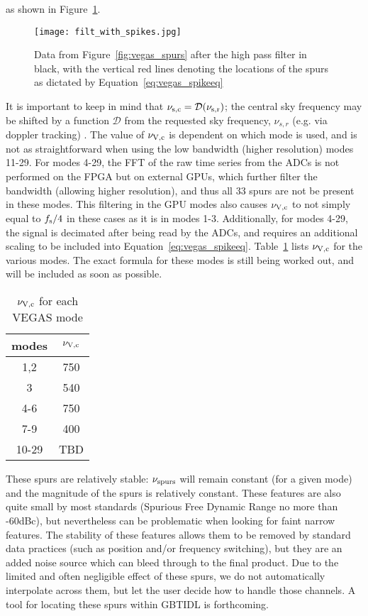 \noindent as shown in Figure~\ref{fig:vegas_spurcalc}.

\begin{figure}[h]
\texttt{[image: filt\_with\_spikes.jpg]}
\caption[Data from Figure~\ref{fig:vegas_spurs} after the high pass filter]
{Data from Figure~\ref{fig:vegas_spurs} after the high pass filter in 
black, with the vertical red lines denoting the locations of the spurs 
as dictated by Equation~\ref{eq:vegas_spikeeq}}
\label{fig:vegas_spurcalc}
\end{figure}

\noindent It is important to keep in mind that 
$\nu_{\rm s,c}=\mathcal{D}(\nu_{\rm s, r})$; the central sky frequency may be 
shifted by a function $\mathcal{D}$ from the requested sky frequency, 
$\nu_{s, r}$ (e.g. via doppler tracking) . The value of $\nu_{\rm V,c}$ is 
dependent on which mode is used, and is not as straightforward when using 
the low bandwidth (higher resolution) modes 11-29. For modes 4-29, the FFT of 
the raw time series from the ADCs is not performed on the FPGA but on 
external GPUs, which further filter the bandwidth (allowing higher resolution), 
and thus all 33 spurs are not be present in these modes. This filtering in 
the GPU modes also causes $\nu_{\rm V,c}$ to not simply equal to $f_{\rm s}/4$ in 
these cases as it is in modes 1-3. Additionally, for modes 4-29, the signal 
is decimated after being read by the ADCs, and requires an additional scaling 
to be included into Equation~\ref{eq:vegas_spikeeq}.  Table~\ref{tab:vegas_centtbl} 
lists $\nu_{\rm V,c}$ for the various modes. The exact formula for 
these modes is still being worked out, and will be included as soon as 
possible.

\begin{table}[h]
\begin{center}
\caption[$\nu_{\rm V,c}$ for each VEGAS mode]
{$\nu_{\rm V,c}$ for each VEGAS mode}
\label{tab:vegas_centtbl}
\begin{tabular}{| c | c |}
\hline
modes & $\nu_{\rm V,c}$ \\ \hline
1,2&750\\
3&540\\
4-6&750\\
7-9&400\\
10-29&TBD\\
\hline
\end{tabular}
\end{center}
\end{table}

These spurs are relatively stable: $\nu_{\rm spurs}$ will remain constant 
(for a given mode) and the magnitude of the spurs is relatively constant. 
These features are also quite small by most standards (Spurious Free 
Dynamic Range no more than -60dBc), but nevertheless can be problematic 
when looking for faint narrow features. The stability of these features 
allows them to be removed by standard data practices (such as position 
and/or frequency switching), but they are an added noise source which can 
bleed through to the final product. Due to the limited and often 
negligible effect of these spurs, we do not automatically interpolate across 
them, but let the user decide how to handle those channels. A tool for 
locating these spurs within GBTIDL is forthcoming.
